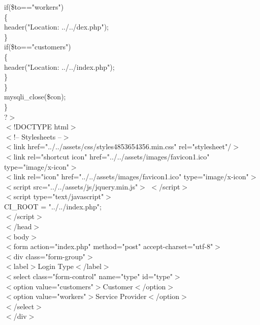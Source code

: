 \documentclass[12pt,a4paper]{report}
\begin{document}
\begin{titlepage}
{                if(\$to=="workers")\\
                \{\\
                   
                    header("Location: ../../dex.php");\\
                \}\\
                if(\$to=="customers")\\
                \{\\
                    
                    header("Location: ../../index.php");\\
                \}\\
                
                    
            \}\\
mysqli\_close(\$con);\\

\}\\
?$>$\\
$<$!DOCTYPE html$>$\\
    $<$!-- Stylesheets --$>$\\
    $<$link href="../../assets/css/styles4853654356.min.css" rel="stylesheet"/$>$\\
   
    $<$link rel="shortcut icon" href="../../assets/images/favicon1.ico" type="image/x-icon"$>$\\
    $<$link rel="icon" href="../../assets/images/favicon1.ico" type="image/x-icon"$>$\\
    $<$script src="../../assets/js/jquery.min.js"$>$ $<$/script$>$\\
    $<$script type="text/javascript"$>$\\
        CI\_ROOT = "../../index.php";\\
    $<$/script$>$\\
$<$/head$>$\\
$<$body$>$\\

                    $<$form action="index.php" method="post" accept-charset="utf-8"$>$\\
                    $<$div class="form-group"$>$\\
                        $<$label$>$Login Type$<$/label$>$\\
                        $<$select class="form-control" name="type" id="type"$>$\\
                            $<$option value="customers"$>$Customer$<$/option$>$\\
                            $<$option value="workers"$>$Service Provider$<$/option$>$\\
                        $<$/select$>$\\
                    $<$/div$>$\\

}
\end{titlepage}
\end{document}
